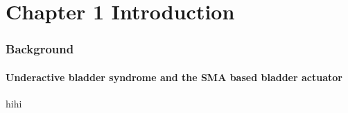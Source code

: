 \part*{Chapter 1 Introduction}


\section{Background}
\subsection{Underactive bladder syndrome and the SMA based bladder actuator}

hihi \cite{xi2017multifunctional}